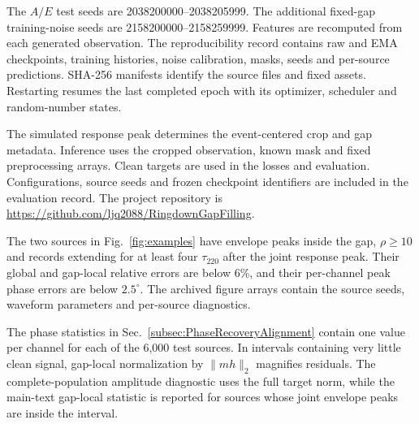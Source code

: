 \documentclass[10pt,prd,aps,a4paper,twocolumn,superscriptaddress,nofootinbib,floatfix]{revtex4-2}
\begin{document}
The $A/E$ test seeds are 2038200000--2038205999. The additional fixed-gap training-noise seeds are 2158200000--2158259999. Features are recomputed from each generated observation. The reproducibility record contains raw and EMA checkpoints, training histories, noise calibration, masks, seeds and per-source predictions. SHA-256 manifests identify the source files and fixed assets. Restarting resumes the last completed epoch with its optimizer, scheduler and random-number states.

The simulated response peak determines the event-centered crop and gap metadata. Inference uses the cropped observation, known mask and fixed preprocessing arrays. Clean targets are used in the losses and evaluation. Configurations, source seeds and frozen checkpoint identifiers are included in the evaluation record. The project repository is \url{https://github.com/ljq2088/RingdownGapFilling}.

The two sources in Fig.~\ref{fig:examples} have envelope peaks inside the gap, $\rho\ge10$ and records extending for at least four $\tau_{220}$ after the joint response peak. Their global and gap-local relative errors are below 6\%, and their per-channel peak phase errors are below $2.5^\circ$. The archived figure arrays contain the source seeds, waveform parameters and per-source diagnostics.

The phase statistics in Sec.~\ref{subsec:PhaseRecoveryAlignment} contain one value per channel for each of the 6,000 test sources. In intervals containing very little clean signal, gap-local normalization by $\|mh\|_2$ magnifies residuals. The complete-population amplitude diagnostic uses the full target norm, while the main-text gap-local statistic is reported for sources whose joint envelope peaks are inside the interval.
\end{document}
